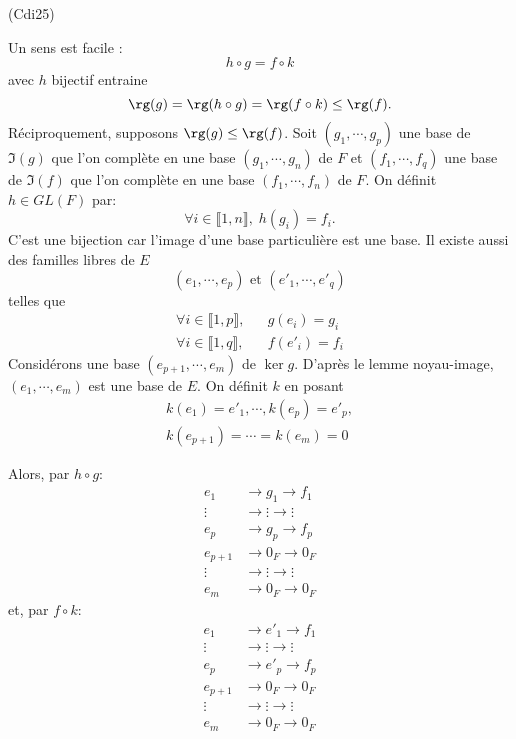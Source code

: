 \begin{tiny}(Cdi25)\end{tiny} Un sens est facile :
\begin{displaymath}
 h \circ g = f \circ k
\end{displaymath}
avec $h$ bijectif entraine
\begin{displaymath}
 \rg(g) = \rg(h \circ g) = \rg(f \circ k) \leq \rg(f).
\end{displaymath}
Réciproquement, supposons $\rg(g) \leq \rg(f)$.\newline
Soit $(g_1,\cdots, g_p)$ une base de $\Im(g)$ que l'on complète en une base $(g_1,\cdots, g_n)$ de $F$ et $(f_1, \cdots , f_q)$ une base de $\Im(f)$ que l'on complète en une base $(f_1, \cdots , f_n)$ de $F$. On définit $h\in GL(F)$ par:
\begin{displaymath}
 \forall i \in \llbracket 1,n \rrbracket, \; h(g_i) = f_i.
\end{displaymath}
C'est une bijection car l'image d'une base particulière est une base. Il existe aussi des familles libres de $E$ 
\begin{displaymath}
 (e_1,\cdots,e_p) \text{ et } (e'_1,\cdots,e'_q)
\end{displaymath}
telles que 
\begin{align*}
 \forall i \in \llbracket 1,p \rrbracket,& &g(e_i) = g_i\\
 \forall i \in \llbracket 1,q \rrbracket,& &f(e'_i) = f_i
\end{align*}
Considérons une base $(e_{p+1},\cdots,e_m)$ de $\ker g$. D'après le lemme noyau-image, $(e_1,\cdots,e_m)$ est une base de $E$. On définit $k$ en posant
\begin{multline*}
 k(e_1) = e'_1, \cdots, k(e_p) = e'_p, \\ k(e_{p+1})= \cdots = k(e_m) = 0
\end{multline*}

Alors, par $h\circ g$:
\begin{align*}
 e_1 &\rightarrow g_1 \rightarrow f_1 \\
 \vdots &\rightarrow \vdots \rightarrow \vdots \\
 e_p &\rightarrow g_p \rightarrow f_p \\
 e_{p+1} &\rightarrow 0_F \rightarrow 0_F \\
 \vdots &\rightarrow \vdots \rightarrow \vdots \\
 e_{m} &\rightarrow 0_F \rightarrow 0_F
\end{align*}
et, par $f\circ k$:
\begin{align*}
 e_1 &\rightarrow e'_1 \rightarrow f_1 \\
 \vdots &\rightarrow \vdots \rightarrow \vdots \\
 e_p &\rightarrow e'_p \rightarrow f_p \\
 e_{p+1} &\rightarrow 0_F \rightarrow 0_F \\
 \vdots &\rightarrow \vdots \rightarrow \vdots \\
 e_{m} &\rightarrow 0_F \rightarrow 0_F
\end{align*}

